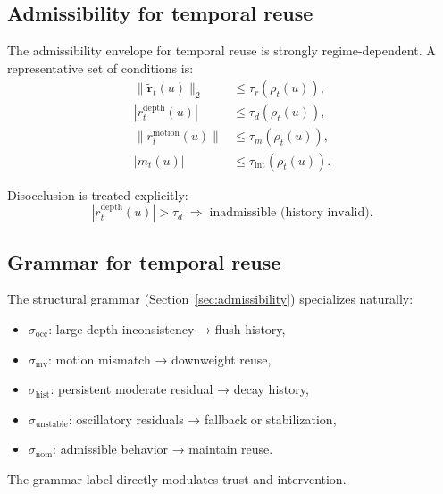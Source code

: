 \documentclass[11pt,letterpaper]{article}
\theoremstyle{gcresult}
\theoremstyle{definition}
\begin{document}

\subsection{Admissibility for temporal reuse}

The admissibility envelope for temporal reuse is strongly regime-dependent. A representative set of conditions is:
\begin{align}
\|\tilde{\mathbf r}_t(u)\|_2 &\le \tau_r(\rho_t(u)),\\
|r^{\mathrm{depth}}_t(u)| &\le \tau_d(\rho_t(u)),\\
\|r^{\mathrm{motion}}_t(u)\| &\le \tau_m(\rho_t(u)),\\
|m_t(u)| &\le \tau_{\mathrm{int}}(\rho_t(u)).
\end{align}

Disocclusion is treated explicitly:
\begin{equation}
|r^{\mathrm{depth}}_t(u)| > \tau_d \;\Rightarrow\; \text{inadmissible (history invalid)}.
\end{equation}


\subsection{Grammar for temporal reuse}

The structural grammar (Section~\ref{sec:admissibility}) specializes naturally:

\begin{itemize}[leftmargin=1.5em]
    \item $\sigma_{\mathrm{occ}}$: large depth inconsistency → flush history,
    \item $\sigma_{\mathrm{mv}}$: motion mismatch → downweight reuse,
    \item $\sigma_{\mathrm{hist}}$: persistent moderate residual → decay history,
    \item $\sigma_{\mathrm{unstable}}$: oscillatory residuals → fallback or stabilization,
    \item $\sigma_{\mathrm{nom}}$: admissible behavior → maintain reuse.
\end{itemize}

The grammar label directly modulates trust and intervention.
\end{document}
